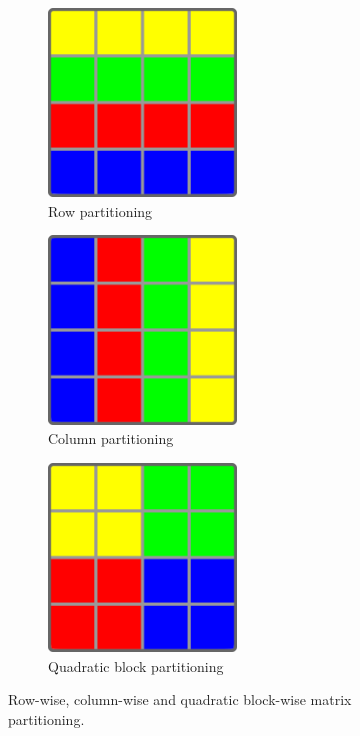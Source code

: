 \begin{figure}
	\centering
	\begin{subfigure}{.3\linewidth}
		\centering
		\includegraphics[width=0.55\textwidth]{images/rowPartitioning.png}
		\caption{Row partitioning}
		\label{fig:rowPartitioning}
	\end{subfigure}
	\begin{subfigure}{.3\linewidth}
		\centering
		\includegraphics[width=0.55\textwidth]{images/columnPartitioning.png}
		\caption{Column partitioning}
		\label{fig:columnPartitioning}
	\end{subfigure}
	\begin{subfigure}{.3\linewidth}
		\centering
		\includegraphics[width=0.55\textwidth]{images/quadraticBlockPartitioning.png}
		\caption{Quadratic block partitioning}
		\label{fig:quadraticBlockPartitioning}
	\end{subfigure}
	\caption{Row-wise, column-wise and quadratic block-wise matrix partitioning.}
	\label{fig:Partitionings}
\end{figure}


